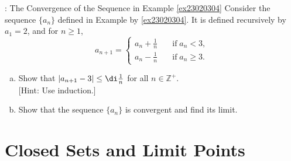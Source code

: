 \atc

\begin{question}{\themyquestion:\; The Convergence of the Sequence in Example \ref{ex23020304}}
Consider the sequence $\{a_n\}$  defined in Example by \ref{ex23020304}. It is defined recursively by $a_1=2$, and for $n\geq 1$,
\[a_{n+1}=\begin{cases} a_n+\frac{1}{n}\quad &\text{if}\;a_n<3,\\a_n-\frac{1}{n}\quad &\text{if}\;a_n\geq 3.\end{cases}\]
\begin{enumerate}
[(a)]
\item
Show that $|a_{n+1}-3|\leq\di\frac{1}{n}$ for all $n\in\mathbb{Z}^+$.\\
$[$Hint: Use induction.$]$
\item Show that the sequence $\{a_n\}$ is convergent and find its limit. 
\end{enumerate}
\end{question}
\vp
\section{Closed Sets and Limit Points }\label{sec1.6}



